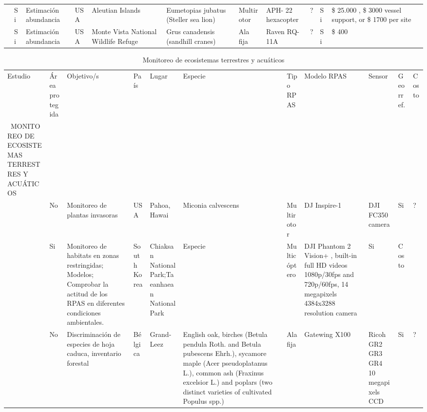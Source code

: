 \documentclass[twocolumn]{extarticle}
\begin{document}
\begin{sidewaystable}
\begin{tabular}{p{2.5cm}p{1cm}p{3cm}p{1cm}p{2cm}p{2cm}p{1cm}p{2cm}p{2cm}p{1cm}p{0.5cm}}
\cite{Christie2016}  &  Si  & Estimación abundancia & USA &  Aleutian Islands & Eumetopias jubatus (Steller sea lion)  & Multirotor & APH- 22 hexacopter & ?  & Si & \$ 25.000 , \$ 3000 vessel support, or \$ 1700 per site \\ 

\cite{Christie2016}  &  Si & Estimación abundancia & USA &  Monte Vista National Wildlife Refuge
 & Grus canadensis (sandhill cranes)  & Ala fija & Raven RQ- 11A & ?  & Si & \$ 400 \\ 

\end{tabular}
\end{sidewaystable}

\begin{sidewaystable}
\centering
\captionsetup{font=scriptsize,labelfont=scriptsize}
\caption{Monitoreo de ecosistemas terrestres y acuáticos}
\label{my-label}
\tiny
\begin{tabular}{p{2.5cm}p{1cm}p{3cm}p{1cm}p{2cm}p{2cm}p{1cm}p{2cm}p{2cm}p{1cm}p{0.5cm}}
\cmidrule(r){1-11}

Estudio & Área protegida & Objetivo/s & País & Lugar & Especie & Tipo RPAS & Modelo RPAS & Sensor & Georref. & Costo \\ \cmidrule(r){1-11}

  \ MONITOREO DE ECOSISTEMAS TERRESTRES Y ACUÁTICOS \\ 
  
  \cite{Perroy2017}  & No & Monitoreo de plantas invasoras & USA & Pahoa, Hawai & Miconia calvescens & Multirotor & DJ Inspire-1 & DJI FC350 camera  & Si & ?  \\ 
  
  \cite{Ivosevic2015}  & Si & Monitoreo de habitats en zonas restringidas; Modelos; Comprobar la actitud de los RPAS en diferentes condiciones ambientales. & South Korea & Chiaksan National Park;Taeanhaean National Park &  Especie & Multicóptero & DJI Phantom 2 Vision+ , built-in full HD videos  1080p/30fps and 720p/60fps, 14 megapixels 4384x3288 resolution camera & Si & Costo \\ 
  
  
  \cite{Lisein2015}  & No & Discriminación de especies de  hoja caduca, inventario forestal & Bélgica & Grand-Leez & English oak, birches (Betula pendula Roth. and Betula pubescens Ehrh.), sycamore maple (Acer pseudoplatanus L.), common ash (Fraxinus excelsior L.) and poplars (two distinct varieties of cultivated Populus spp.) & Ala fija & Gatewing X100  & Ricoh GR2 GR3 GR4 10 megapixels CCD  & Si & ?  \\ 
  

\end{tabular}
\end{sidewaystable}
\end{document}
